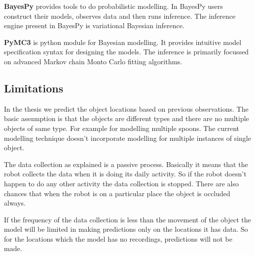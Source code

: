 \textbf{BayesPy} provides tools to do probabilistic modelling. In BayesPy users construct their models, observes data and then runs inference. The inference engine present in BayesPy is variational Bayesian inference.

\textbf{PyMC3} is python module for Bayesian modelling. It provides intuitive model specification syntax for designing the models. The inference is primarily focussed on advanced Markov chain Monto Carlo fitting algorithms.

 

\subsection{Limitations }
\label{sub:}

In the thesis we predict the object locations based on previous observations. The basic assumption is that the objects are different types and there are no multiple objects of same type. For example for modelling multiple spoons. The current modelling technique doesn't incorporate modelling for multiple instances of single object.
 
The data collection as explained is a passive process. Basically it means that the robot collects the data when it is doing its daily activity. So if the robot doesn't happen to do any other activity the data collection is stopped.
There are also chances that when the robot is on a particular place the object is occluded always.

If the frequency of the data collection is less than the movement of the object the model will be limited in making predictions only on the locations it has data. So for the locations which the model has no recordings, predictions will not be made.


